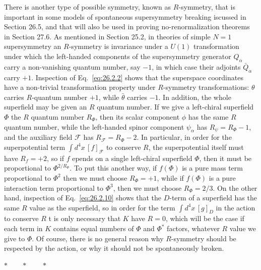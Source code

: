 There is another type of possible symmetry, known as $R$-symmetry, that is
important in some models of spontaneous supersymmetry breaking \dd iscussed in
Section 26.5, and that will also be used in proving no-renormalization
theorems in Section 27.6. As mentioned in Section 25.2, in theories of simple
$N=1$ supersymmetry an $R$-symmetry is invariance under a $U(1)$
transformation under which the left-handed components of the supersymmetry
generator \(Q_\alpha\) carry a non-vanishing quantum number, say \(-1\), in
which case their adjoints \(\bar Q_{\dot\alpha}\) carry \(+1\). Inspection of
Eq.~\eqref{eq:26.2.2} shows that the superspace coordinates have a
non-trivial transformation property under $R$-symmetry transformations:
\(\theta\) carries \(R\)-quantum number \(+1\), while \(\bar\theta\)
carries \(-1\). In addition,
the whole superfield may be given an $R$ quantum number. If we give a
left-chiral superfield $\Phi$ the $R$ quantum number $R_\Phi$, then its scalar
component $\phi$ has the same $R$ quantum number, while the left-handed spinor
component \(\psi_\alpha\) has \(R_\psi=R_\Phi-1\), and the auxiliary field
$\mathcal{F}$ has $R_{\mathcal{F}}=R_\Phi-2$. In particular, in order for the
superpotential term $\int d^4x\,[f]_{\mathcal{F}}$ to conserve $R$, the
superpotential itself must have $R_f=+2$, so if $f$ \dd epends on a single
left-chiral superfield $\Phi$, then it must be proportional to
$\Phi^{2/R_\Phi}$. To put this another way, if $f(\Phi)$ is a pure mass term
proportional to $\Phi^2$ then we must choose $R_\Phi=+1$, while if $f(\Phi)$
is a pure interaction term proportional to $\Phi^3$, then we must choose
$R_\Phi=2/3$. On the other hand, inspection of Eq.~\eqref{eq:26.2.10} shows
that the $D$-term of a superfield has the same $R$ value as the superfield, so
in order for the term $\int d^4x\,[g]_D$ in the action to conserve $R$ \ii t is
only necessary that $K$ have $R=0$, which will be the case if each term in
$K$ contains equal numbers of $\Phi$ and $\Phi^*$ factors, whatever $R$ value
we give to $\Phi$. Of course, there is no general reason why $R$-symmetry
should be respected by the action, or why it should not be spontaneously
broken.

\begin{center}
\(\ast\qquad\ast\qquad\ast\)
\end{center}

